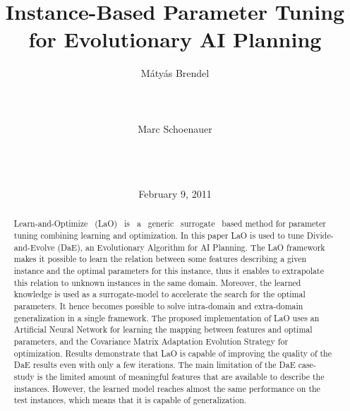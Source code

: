 \documentclass{MYsig-alternate}
\begin{document}
\title{Instance-Based Parameter Tuning\\
for Evolutionary AI Planning}


 
 \author{
 \alignauthor
 M{\'a}ty{\'a}s Brendel\\
        \\
        \\
        \\
 \alignauthor
 Marc Schoenauer\\
        \\
        \\
        \\
 }

\date{February 9, 2011}
\maketitle
\begin{abstract}
\noindent Learn-and-Optimize ~(LaO) ~is ~a ~generic ~surrogate ~based method for parameter tuning combining learning and optimization. In this paper LaO is used to tune Divide-and-Evolve (DaE), an Evolutionary Algorithm for AI Planning. The LaO framework makes it possible to learn the relation between some features describing a given instance and the optimal parameters for this instance, thus it enables to extrapolate this relation to unknown instances in the same domain. Moreover, the learned knowledge is used as a surrogate-model to accelerate the search for the optimal parameters. It hence becomes possible to solve intra-domain and extra-domain generalization in a single framework. The proposed implementation of LaO uses an Artificial Neural Network for learning the mapping between features and optimal parameters, and the Covariance Matrix Adaptation Evolution Strategy for optimization. Results demonstrate that LaO is capable of improving the quality of the DaE results even with only a few iterations. The main limitation of the DaE case-study is the limited amount of meaningful features that are available to describe the instances. However, the learned model reaches almost the same performance on the test instances, which means that it is capable of generalization. 

\end{abstract}
\end{document}
